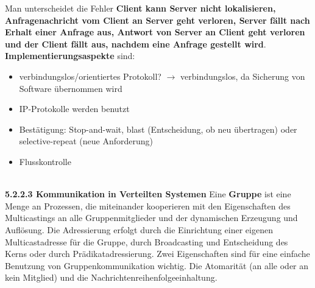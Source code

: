 \documentclass{article}
\begin{document}
    Man unterscheidet die Fehler \textbf{Client kann Server nicht lokalisieren, Anfragenachricht vom Client an Server geht verloren, Server fällt nach Erhalt einer Anfrage aus, Antwort von Server an Client geht verloren und der Client fällt aus, nachdem eine Anfrage gestellt wird}.\newline
    \textbf{Implementierungsaspekte} sind:
    \begin{itemize}
        \item verbindungslos/orientiertes  Protokoll? $\rightarrow$ verbindungslos, da Sicherung von Software übernommen wird
        \item IP-Protokolle werden benutzt
        \item Bestätigung: Stop-and-wait, blast (Entscheidung, ob neu übertragen) oder selective-repeat (neue Anforderung)
        \item Flusskontrolle 
    \end{itemize}\newline
    \\
    \textbf{5.2.2.3 Kommunikation in Verteilten Systemen}\newline
    Eine \textbf{Gruppe} ist eine Menge an Prozessen, die miteinander kooperieren mit den Eigenschaften des Multicastings an alle Gruppenmitglieder und der dynamischen Erzeugung und Auflösung.\newline
    Die Adressierung erfolgt durch die Einrichtung einer eigenen Multicastadresse für die Gruppe, durch Broadcasting und Entscheidung des Kerns oder durch Prädikatadressierung.\newline
    Zwei Eigenschaften sind für eine einfache Benutzung von Gruppenkommunikation wichtig. Die Atomarität (an alle oder an kein Mitglied) und die Nachrichtenreihenfolgeeinhaltung. 
\end{document}
